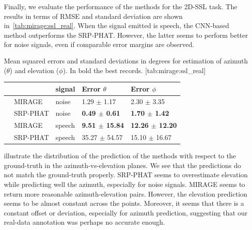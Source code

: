 \mynewline
Finally, we evaluate the performance of the methods for the 2D-\ac{SSL} task.
The results in terms of \ac{RMSE} and standard deviation are shown in~\cref{tab:mirage:ssl_real}.
When the signal emitted is speech, the CNN-based method outperforms the \ac{SRP-PHAT}.
However, the latter seems to perform better for noise signals, even if comparable error margins are observed.

\begin{table}[h]
    \begin{sidecaption}[]{
        Mean squared errors and standard deviations in degrees for estimation of azimuth ($\theta$) and elevation ($\phi$).
        In bold the best records.
    }[tab:mirage:ssl_real]
    \centering
    \small
    \begin{tabular*}{\linewidth}{@{\extracolsep{\fill}}lllll@{}}
        \toprule
        &          &  signal &  Error $\theta$  &  Error $\phi$ \\
        \midrule
        & MIRAGE   &   noise &   1.29 $\pm$   1.17 &     2.30 $\pm$  3.35 \\
        & SRP-PHAT &   noise &   \textbf{0.49 $\pm$   0.61} &     \textbf{1.70 $\pm$  1.42} \\
        \midrule
        & MIRAGE   &  speech & \textbf{  9.51 $\pm$  15.84} &    \textbf{12.26 $\pm$ 12.20} \\
        & SRP-PHAT &  speech &  35.27 $\pm$  54.57 &    15.10 $\pm$ 16.67 \\
        \bottomrule
    \end{tabular*}

    \end{sidecaption}
\end{table}

\mynewline
{} illustrate the distribution of the prediction of the methods with respect to the ground-truth in the azimuth-vs-elevation planes.
We see that the predictions do not match the ground-truth properly.
SRP-PHAT seems to overestimate elevation while predicting well the azimuth, especially for noise signals.
MIRAGE seems to return more reasonable azimuth-elevation pairs.
However, the elevation prediction seems to be almost constant across the points.
Moreover, it seems that there is a constant offset or deviation, especially for azimuth prediction, suggesting that our real-data annotation was perhaps no accurate enough.

